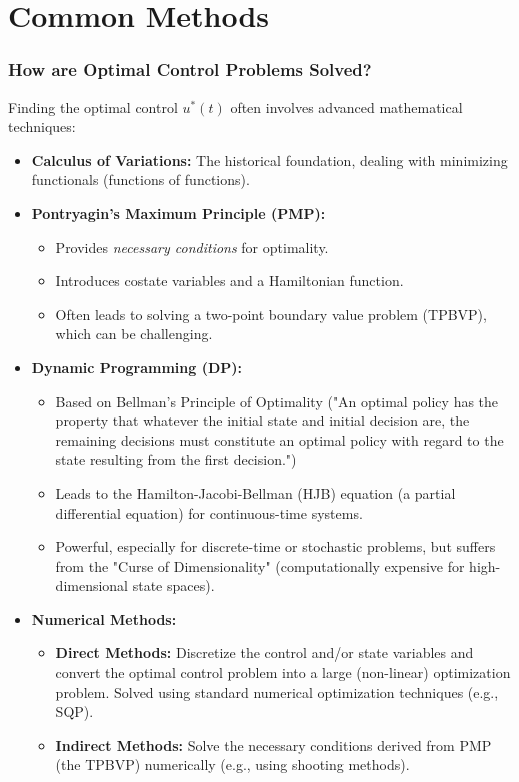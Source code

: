 \documentclass{beamer}
\begin{document}
\section{Common Methods}
\begin{frame}
\frametitle{How are Optimal Control Problems Solved?}
    Finding the optimal control $u^*(t)$ often involves advanced mathematical techniques:
    \begin{itemize}
        \item \textbf{Calculus of Variations:} The historical foundation, dealing with minimizing functionals (functions of functions).

        \item \textbf{Pontryagin's Maximum Principle (PMP):}
        \begin{itemize}
            \item Provides \emph{necessary conditions} for optimality.
            \item Introduces costate variables and a Hamiltonian function.
            \item Often leads to solving a two-point boundary value problem (TPBVP), which can be challenging.
        \end{itemize}

        \item \textbf{Dynamic Programming (DP):}
        \begin{itemize}
            \item Based on Bellman's Principle of Optimality ("An optimal policy has the property that whatever the initial state and initial decision are, the remaining decisions must constitute an optimal policy with regard to the state resulting from the first decision.")
            \item Leads to the Hamilton-Jacobi-Bellman (HJB) equation (a partial differential equation) for continuous-time systems.
            \item Powerful, especially for discrete-time or stochastic problems, but suffers from the "Curse of Dimensionality" (computationally expensive for high-dimensional state spaces).
        \end{itemize}

        \item \textbf{Numerical Methods:}
        \begin{itemize}
            \item \textbf{Direct Methods:} Discretize the control and/or state variables and convert the optimal control problem into a large (non-linear) optimization problem. Solved using standard numerical optimization techniques (e.g., SQP).
            \item \textbf{Indirect Methods:} Solve the necessary conditions derived from PMP (the TPBVP) numerically (e.g., using shooting methods).
        \end{itemize}
    \end{itemize}
\end{frame}
\end{document}
